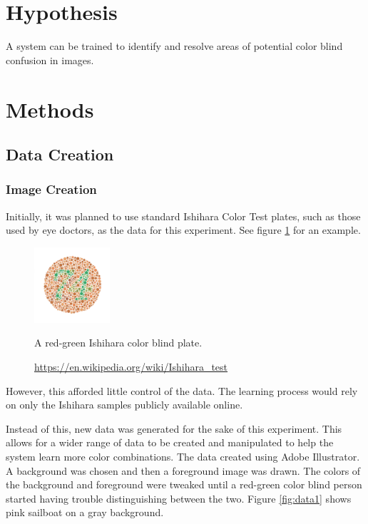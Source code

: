 \documentclass[12pt]{article}
\begin{document}
\section{Hypothesis}
A system can be trained to identify and resolve areas of potential color blind confusion in images.


\section{Methods}

\subsection{Data Creation}
\subsubsection{Image Creation}
Initially, it was planned to use standard Ishihara Color Test plates, such as those used by eye doctors, as the data for this experiment. See figure \ref{fig:ishi} for an example.

\begin{figure}[H]
	\centering
	\includegraphics[width=0.25\textwidth]{img/Ishihara}
	\caption{A red-green Ishihara color blind plate.}
	\caption*{\href{https://en.wikipedia.org/wiki/Ishihara\_test}{https://en.wikipedia.org/wiki/Ishihara\_test}}
	\label{fig:ishi}
\end{figure}

However, this afforded little control of the data. The learning process would rely on only the Ishihara samples publicly available online. 

Instead of this, new data was generated for the sake of this experiment. This allows for a wider range of data to be created and manipulated to help the system learn more color combinations. The data created using Adobe Illustrator. A background was chosen and then a foreground image was drawn. The colors of the background and foreground were tweaked until a red-green color blind person started having trouble distinguishing between the two. Figure \ref{fig:data1} shows pink sailboat on a gray background.
\end{document}
